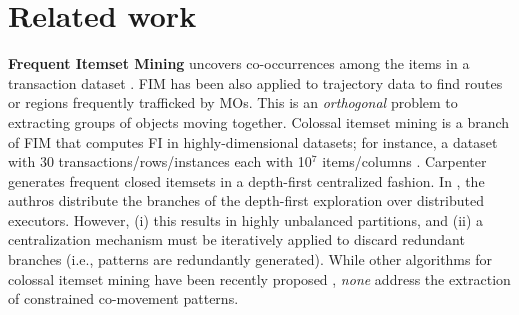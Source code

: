 \documentclass[
]{ceurart}
\begin{document}
\section{Related work}\label{sec:related}

\textbf{Frequent Itemset Mining} uncovers co-occurrences among the items in a transaction dataset \citep{DBLP:conf/vldb/AgrawalS94}. 
FIM has been also applied to trajectory data to find routes \citep{DBLP:conf/ideal/QiuP16,DBLP:journals/access/FuTXZ17} or regions \citep{zheng2018spatial} frequently trafficked by MOs.
This is an \textit{orthogonal} problem to extracting groups of objects moving together.
% 
Colossal itemset mining is a branch of FIM that computes FI in highly-dimensional datasets; for instance, a dataset with 30 transactions/rows/instances each with 10$^7$ items/columns \citep{DBLP:journals/bdr/ApilettiBCGPM17}.
Carpenter \citep{DBLP:conf/kdd/PanCTYZ03} generates frequent closed itemsets in a depth-first centralized fashion.
In \cite{DBLP:journals/bdr/ApilettiBCGPM17}, the authros distribute the branches of the depth-first exploration over distributed executors. 
However, (i) this results in highly unbalanced partitions,
and (ii) a centralization mechanism must be iteratively applied to discard redundant branches (i.e., patterns are redundantly generated).
While other algorithms for colossal itemset mining have been recently proposed \citep{DBLP:conf/kdd/PanCTYZ03,DBLP:journals/kbs/ZakiZ18,DBLP:journals/isci/VanahalliP19}, \textit{none} address the extraction of constrained co-movement patterns.
\end{document}
